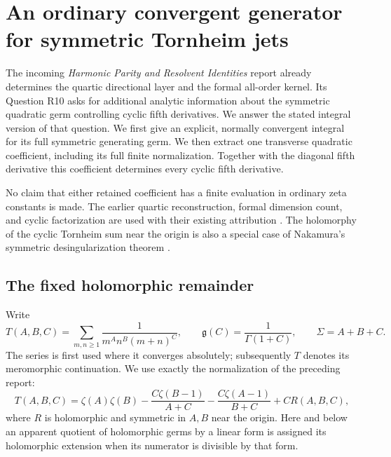 \section{An ordinary convergent generator for symmetric Tornheim jets}
\label{bhr:fcy:section}

The incoming \emph{Harmonic Parity and Resolvent Identities} report
already determines the quartic directional layer and the formal
all-order kernel. Its Question R10 asks for additional
analytic information about the symmetric quadratic germ controlling
cyclic fifth derivatives. We answer the stated integral version of
that question. We first give an explicit, normally convergent integral
for its full symmetric generating germ. We then extract one
transverse quadratic coefficient, including its full finite
normalization. Together with the diagonal fifth derivative this
coefficient determines every cyclic fifth derivative.

No claim that either retained coefficient has a finite evaluation in
ordinary zeta constants is made. The earlier quartic reconstruction,
formal dimension count, and cyclic factorization are used with their
existing attribution \cite{bhr:Parity}. The holomorphy of the cyclic
Tornheim sum near the origin is also a special case of Nakamura's
symmetric desingularization theorem \cite[Theorem 1.2]{bhr:Nakamura}.

\subsection{The fixed holomorphic remainder}

Write
\[
 T(A,B,C)=\sum_{m,n\ge1}\frac1{m^A n^B(m+n)^C},\qquad
 \mathfrak g(C)=\frac1{\Gamma(1+C)},\qquad \Sigma=A+B+C.
\]
The series is first used where it converges absolutely; subsequently
\(T\) denotes its meromorphic continuation. We use exactly the
normalization of the preceding report:
\begin{equation}\label{bhr:fcy:R}
 T(A,B,C)=\zeta(A)\zeta(B)
 -\frac{C\zeta(B-1)}{A+C}-\frac{C\zeta(A-1)}{B+C}
 +C R(A,B,C),
\end{equation}
where \(R\) is holomorphic and symmetric in \(A,B\) near the
origin. Here and below an apparent quotient of holomorphic germs by a
linear form is assigned its holomorphic extension when its numerator
is divisible by that form.

